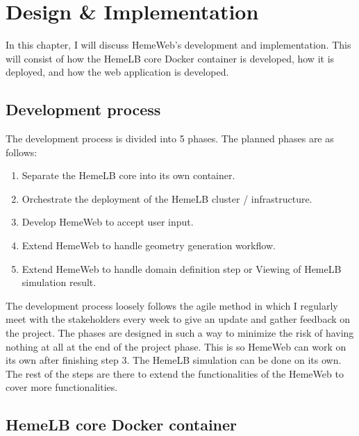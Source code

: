  

\chapter[Design \& Implementation]{Design \& Implementation}

In this chapter, I will discuss HemeWeb's development and implementation. This will consist of how the HemeLB core Docker container is developed, how it is deployed, and how the web application is developed.

\section{Development process}

The development process is divided into 5 phases. The planned phases are as follows:

\begin{enumerate}
    \item{Separate the HemeLB core into its own container.}
    \item{Orchestrate the deployment of the HemeLB cluster / infrastructure.}
    \item{Develop HemeWeb to accept user input.}
    \item{Extend HemeWeb to handle geometry generation workflow.}
    \item{Extend HemeWeb to handle domain definition step or Viewing of HemeLB simulation result.}
\end{enumerate}

The development process loosely follows the agile method in which I regularly meet with the stakeholders every week to give an update and gather feedback on the project. The phases are designed in such a way to minimize the risk of having nothing at all at the end of the project phase. This is so HemeWeb can work on its own after finishing step 3. The HemeLB simulation can be done on its own. The rest of the steps are there to extend the functionalities of the HemeWeb to cover more functionalities.


\section{HemeLB core Docker container}

